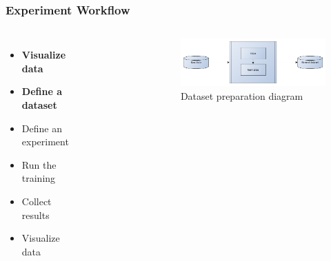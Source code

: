 \documentclass[aspectratio=169,11pt,hyperref={colorlinks=true}]{beamer}
\begin{document}
\begin{frame}
    \frametitle{Experiment Workflow}
    \begin{columns}
        \begin{itemize}
            \item{\textbf{Visualize data}}
            \item{\textbf{Define a dataset}}
            \item{Define an experiment}
            \item{Run the training}
            \item{Collect results}
            \item{Visualize data}
        \end{itemize}
          \begin{figure}
            
          \end{figure}
          \begin{figure}
            \includegraphics[width=1\textwidth]{diagrams/build-dataset.png}
            \caption{Dataset preparation diagram}
          \end{figure}
    \end{columns}
\end{frame}
\end{document}

